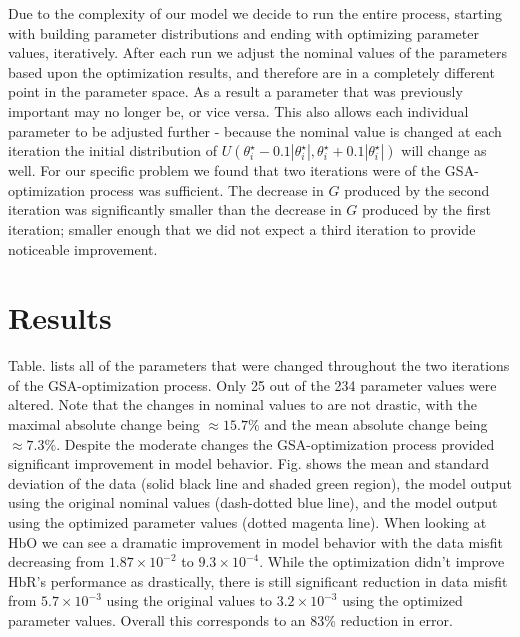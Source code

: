 \documentclass[10pt,letterpaper]{article}
\begin{document}
	Due to the complexity of our model we decide to run the entire process, starting with building parameter distributions and ending with optimizing parameter values, iteratively. After each run we adjust the nominal values of the parameters based upon the optimization results, and therefore are in a completely different point in the parameter space. As a result a parameter that was previously important may no longer be, or vice versa. This also allows each individual parameter to be adjusted further - because the nominal value is changed at each iteration the initial distribution of $U(\theta_i^\star-0.1|\theta_i^\star|,\theta_i^\star+0.1|\theta_i^\star|)$ will change as well. For our specific problem we found that two iterations were of the GSA-optimization process was sufficient. The decrease in $G$ produced by the second iteration was significantly smaller than the decrease in $G$ produced by the first iteration; smaller enough that we did not expect a third iteration to provide noticeable improvement.
	
	
	
	
	\section*{Results}
	
	Table. lists all of the parameters that were changed throughout the two iterations of the GSA-optimization process. Only 25 out of the 234 parameter values were altered. Note that the changes in nominal values to are not drastic, with the maximal absolute change being $\approx 15.7\%$ and the mean absolute change being $\approx 7.3\%$.  Despite the moderate changes the GSA-optimization process provided significant improvement in model behavior. Fig. shows the mean and standard deviation of the data (solid black line and shaded green region), the model output using the original nominal values (dash-dotted blue line), and the model output using the optimized parameter values (dotted magenta line). When looking at HbO we can see a dramatic improvement in model behavior with the data misfit decreasing from $1.87\times10^{-2}$ to $9.3\times10^{-4}$. While the optimization didn't improve HbR's performance as drastically, there is still significant reduction in data misfit from $5.7 \times 10^{−3}$ using the original values to $3.2 \times 10^{−3}$ using the optimized parameter values. Overall this corresponds to an 83\% reduction in error.
	
\end{document}
